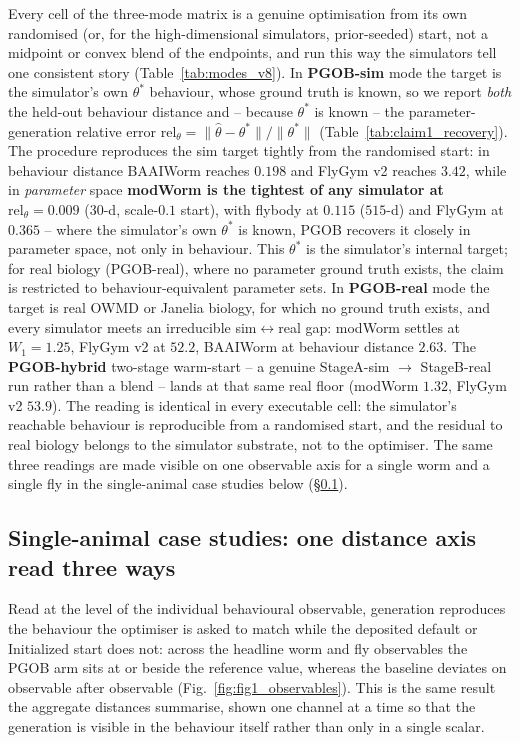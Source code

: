 \documentclass[11pt]{article}
\begin{document}
Every cell of the three-mode matrix is a genuine optimisation from its own randomised (or, for the high-dimensional simulators, prior-seeded) start, not a midpoint or convex blend of the endpoints, and run this way the simulators tell one consistent story (Table~\ref{tab:modes_v8}). In \textbf{PGOB-sim} mode the target is the simulator's own $\theta^{*}$ behaviour, whose ground truth is known, so we report \emph{both} the held-out behaviour distance and -- because $\theta^{*}$ is known -- the parameter-generation relative error $\mathrm{rel}_\theta{=}\lVert\hat\theta-\theta^{*}\rVert/\lVert\theta^{*}\rVert$ (Table~\ref{tab:claim1_recovery}). The procedure reproduces the sim target tightly from the randomised start: in behaviour distance BAAIWorm reaches $0.198$ and FlyGym v2 reaches $3.42$, while in \emph{parameter} space \textbf{modWorm is the tightest of any simulator at $\mathrm{rel}_\theta{=}0.009$} ($30$-d, scale-$0.1$ start), with flybody at $0.115$ ($515$-d) and FlyGym at $0.365$ -- where the simulator's own $\theta^{*}$ is known, PGOB recovers it closely in parameter space, not only in behaviour. This $\theta^{*}$ is the simulator's internal target; for real biology (PGOB-real), where no parameter ground truth exists, the claim is restricted to behaviour-equivalent parameter sets. In \textbf{PGOB-real} mode the target is real OWMD or Janelia biology, for which no ground truth exists, and every simulator meets an irreducible sim$\leftrightarrow$real gap: modWorm settles at $W_1{=}1.25$, FlyGym v2 at $52.2$, BAAIWorm at behaviour distance $2.63$. The \textbf{PGOB-hybrid} two-stage warm-start -- a genuine StageA-sim $\to$ StageB-real run rather than a blend -- lands at that same real floor (modWorm $1.32$, FlyGym v2 $53.9$). The reading is identical in every executable cell: the simulator's reachable behaviour is reproducible from a randomised start, and the residual to real biology belongs to the simulator substrate, not to the optimiser. The same three readings are made visible on one observable axis for a single worm and a single fly in the single-animal case studies below (\S\ref{sec:case_studies}).

\subsection{Single-animal case studies: one distance axis read three ways}
\label{sec:case_studies}

Read at the level of the individual behavioural observable, generation reproduces the behaviour the optimiser is asked to match while the deposited default or Initialized start does not: across the headline worm and fly observables the PGOB arm sits at or beside the reference value, whereas the baseline deviates on observable after observable (Fig.~\ref{fig:fig1_observables}). This is the same result the aggregate distances summarise, shown one channel at a time so that the generation is visible in the behaviour itself rather than only in a single scalar.
\end{document}
